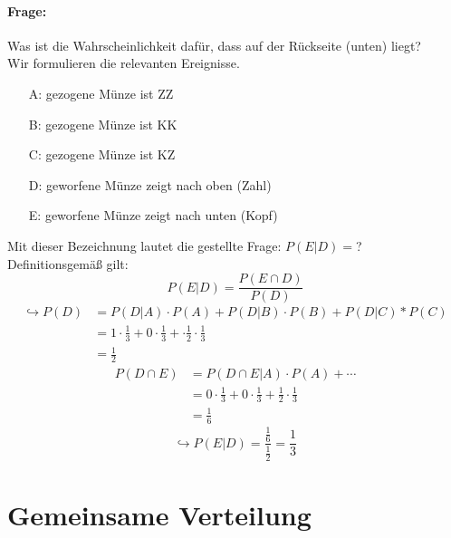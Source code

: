 \documentclass[12pt,a4paper]{article}
\begin{document}
	\paragraph{Frage:}
	Was ist die Wahrscheinlichkeit dafür, dass auf der Rückseite (unten)  liegt?\\
	Wir formulieren die relevanten Ereignisse.
	\begin{itemize}
		\item[A:] gezogene Münze ist ZZ
		\item[B:] gezogene Münze ist KK
		\item[C:] gezogene Münze ist KZ
		\item[D:] geworfene Münze zeigt nach oben  (Zahl)
		\item[E:] geworfene Münze zeigt nach unten  (Kopf)
	\end{itemize}
	Mit dieser Bezeichnung lautet die gestellte Frage: $P(E|D)=$? \\
	Definitionsgemäß gilt: 
	$$P(E|D)=\frac{P(E\cap D)}{P(D)}$$
	\begin{align*}
	\hookrightarrow P(D)&= P(D|A)\cdot P(A) + P(D|B)\cdot P(B) + P(D|C)*P(C)\\
	 &= 1 \cdot \frac{1}{3} + 0 \cdot \frac{1}{3} + \cdot \frac{1}{2} \cdot\frac{1}{3}\\
	  &= \frac{1}{2}
	\end{align*}
	\begin{align*}
	P(D\cap E) &= P(D\cap E|A)\cdot P(A) + \cdots\\
	 &= 0 \cdot \frac{1}{3} + 0\cdot\frac{1}{3} + \frac{1}{2}\cdot\frac{1}{3}\\
	 &=\frac{1}{6}
	\end{align*}
	$$\hookrightarrow P(E|D) = \frac{\frac{1}{6}}{\frac{1}{2}}=\frac{1}{3}$$


\section{Gemeinsame Verteilung}
\end{document}
